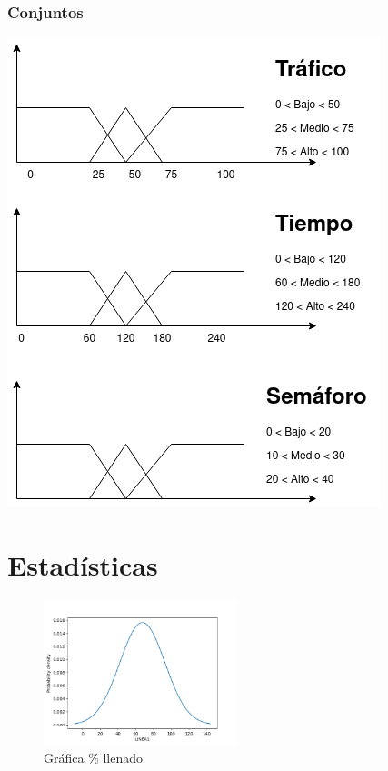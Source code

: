 \documentclass{article}
\begin{document}
\subsubsection{Conjuntos}
\includegraphics[scale=0.6]{logica_difusa.png}


\newpage
\section{Estadísticas}

\begin{figure}[h!]
\caption{Gráfica \% llenado}
\centering
\includegraphics[width=0.5\textwidth]{linea1.png}
\end{figure}
\end{document}
